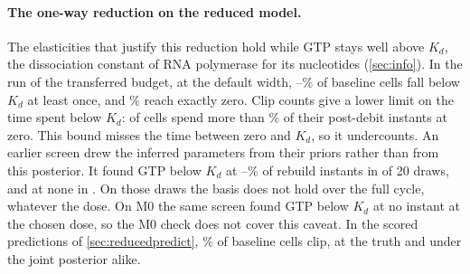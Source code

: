\paragraph{The one-way reduction on the reduced model.} The elasticities that justify this
reduction hold while GTP stays well above $K_d$, the dissociation constant of RNA
polymerase for its nucleotides (\cref{sec:info}). In the run of the transferred budget, at the
default width, --\% of baseline cells fall below $K_d$ at least once, and
\% reach exactly zero. Clip counts give a lower limit on the time spent below $K_d$:
 of  cells spend more than \% of their
post-debit instants at zero. This bound misses the time between zero and $K_d$, so it
undercounts. An earlier screen drew the inferred parameters from their priors rather than
from this posterior. It found GTP below $K_d$ at
--\% of rebuild instants in  of 20 draws,
and at none in . On those draws the basis does not hold over the full
cycle, whatever the dose. On M0 the same screen found GTP below $K_d$ at no
instant at the chosen dose, so the M0 check does not cover this caveat. In the scored
predictions of \cref{sec:reducedpredict}, \% of baseline cells clip, at the truth
and under the joint posterior alike.
